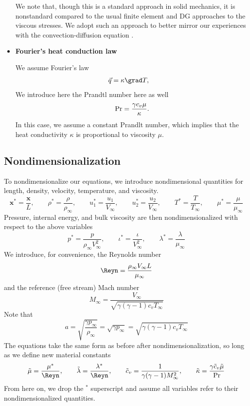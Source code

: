 \begin{itemize}
We note that, though this is a standard approach in solid mechanics, it is nonstandard compared to the usual finite element and DG approaches to the viscous stresses. We adopt such an approach to better mirror our experiences with the convection-diffusion equation \cite{DPGrobustness,DPGrobustness2}. 

\item \textbf{Fourier's heat conduction law}

We assume Fourier's law 
\begin{align*}
\vec{q} &= \kappa \grad T,
\end{align*}
We introduce here the Prandtl number here as well
\[
{\rm Pr} = \frac{\gamma c_v \mu}{\kappa}.
\]
In this case, we assume a constant Prandlt number, which implies that the heat conductivity $\kappa$ is proportional to viscosity $\mu$.

\end{itemize}

\subsection{Nondimensionalization}
To nondimensionalize our equations, we introduce nondimensional quantities for length, density, velocity, temperature, and viscosity. 
\[
\boldsymbol x^* = \frac{\boldsymbol x}{L}, \qquad \rho^* = \frac{\rho}{\rho_{\infty}}, \qquad u_1^* = \frac{u_1}{V_\infty}, \qquad u_2^* = \frac{u_2}{V_\infty}, \qquad T^* = \frac{T}{T_\infty}, \qquad \mu^* = \frac{\mu}{\mu_\infty}
\]
Pressure, internal energy, and bulk viscosity are then nondimensionalized with respect to the above variables
\[
p^* = \frac{p}{\rho_\infty V_\infty^2}, \qquad \iota^* = \frac{\iota}{V_\infty^2}, \qquad \lambda^* = \frac{\lambda}{\mu_\infty}
\]
We introduce, for convenience, the Reynolds number
\[
\Reyn = \frac{\rho_\infty V_\infty L}{\mu_\infty} 
\]
and the reference (free stream) Mach number
\[
M_\infty = \frac{V_\infty}{\sqrt{\gamma(\gamma-1)c_vT_\infty}}
\]
Note that 
\[
a = \sqrt{\frac{\gamma p_\infty}{\rho_\infty}} = \sqrt{{\gamma p_\infty}} = \sqrt{\gamma(\gamma-1)c_vT_\infty}
\]
The equations take the same form as before after nondimensionalization, so long as we define new material constants
\[
\tilde{\mu} = \frac{\mu^*}{\Reyn}, \qquad \tilde{\lambda} = \frac{\lambda^*}{\Reyn}, \qquad \tilde{c}_v = \frac{1}{\gamma(\gamma-1)M_\infty^2}, \qquad \tilde{\kappa} = \frac{\gamma\tilde{c}_v\tilde{\mu}}{\rm Pr}
\]
From here on, we drop the $^*$ superscript and assume all variables refer to their nondimensionalized quantities.

